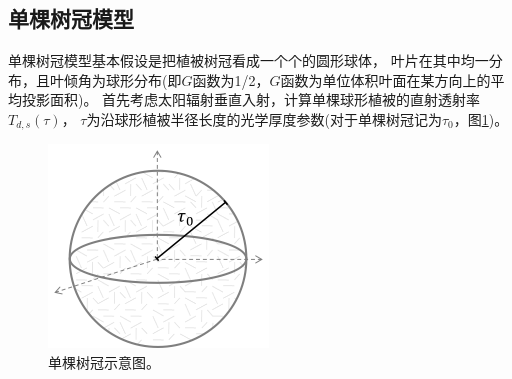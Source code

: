 \subsection{单棵树冠模型}
单棵树冠模型基本假设是把植被树冠看成一个个的圆形球体，
叶片在其中均一分布，且叶倾角为球形分布(即$G$函数为1/2，$G$函数为单位体积叶面在某方向上的平均投影面积)。
首先考虑太阳辐射垂直入射，计算单棵球形植被的直射透射率$T_{d,s}\left(\tau\right)$，
$\tau$为沿球形植被半径长度的光学厚度参数(对于单棵树冠记为$\tau_0$，图\ref{fig:单棵树冠示意图})。
{
\begin{figure}[]
\centering
\includegraphics{Figures/辐射过程及辐射通量计算/单棵树冠示意图.png}
\caption{单棵树冠示意图。}
\label{fig:单棵树冠示意图}
\end{figure}
}


